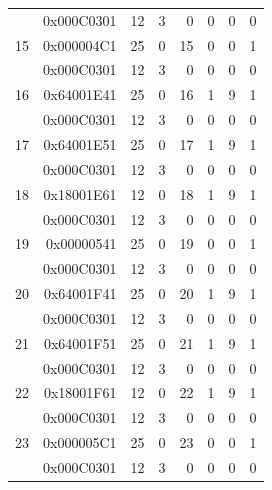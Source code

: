 \begin{longtable}{r r r r r r r r}
  & 0x000C0301 & 12 & 3 & 0 & 0 & 0 & 0 \\
15 & 0x000004C1 & 25 & 0 & 15 & 0 & 0 & 1 \\
  & 0x000C0301 & 12 & 3 & 0 & 0 & 0 & 0 \\
16 & 0x64001E41 & 25 & 0 & 16 & 1 & 9 & 1 \\
  & 0x000C0301 & 12 & 3 & 0 & 0 & 0 & 0 \\
17 & 0x64001E51 & 25 & 0 & 17 & 1 & 9 & 1 \\
  & 0x000C0301 & 12 & 3 & 0 & 0 & 0 & 0 \\
18 & 0x18001E61 & 12 & 0 & 18 & 1 & 9 & 1 \\
  & 0x000C0301 & 12 & 3 & 0 & 0 & 0 & 0 \\
19 & 0x00000541 & 25 & 0 & 19 & 0 & 0 & 1 \\
  & 0x000C0301 & 12 & 3 & 0 & 0 & 0 & 0 \\
20 & 0x64001F41 & 25 & 0 & 20 & 1 & 9 & 1 \\
  & 0x000C0301 & 12 & 3 & 0 & 0 & 0 & 0 \\
21 & 0x64001F51 & 25 & 0 & 21 & 1 & 9 & 1 \\
  & 0x000C0301 & 12 & 3 & 0 & 0 & 0 & 0 \\
22 & 0x18001F61 & 12 & 0 & 22 & 1 & 9 & 1 \\
  & 0x000C0301 & 12 & 3 & 0 & 0 & 0 & 0 \\
23 & 0x000005C1 & 25 & 0 & 23 & 0 & 0 & 1 \\
  & 0x000C0301 & 12 & 3 & 0 & 0 & 0 & 0 \\


\end{longtable}
